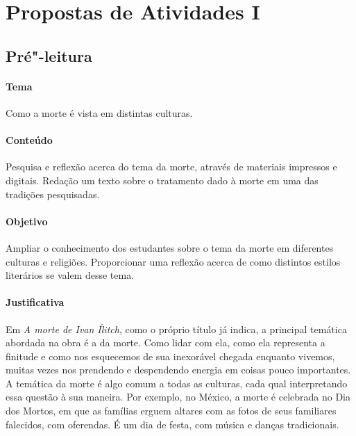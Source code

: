\documentclass[12pt]{extarticle}
\begin{document}
\section{Propostas de Atividades I}

\subsection{Pré"-leitura}

\paragraph{Tema} Como a morte é vista em distintas culturas.

\paragraph{Conteúdo} Pesquisa e reflexão acerca do tema da morte, 
através de materiais impressos e digitais. Redação um texto
sobre o tratamento dado à morte em uma das tradições pesquisadas. 

\paragraph{Objetivo} Ampliar o conhecimento dos estudantes sobre o tema da morte
em diferentes culturas e religiões. Proporcionar uma reflexão acerca
de como distintos estilos literários se valem desse tema.

\paragraph{Justificativa} Em \emph{A morte de Ivan Ílitch}, 
como o próprio título já indica, a principal temática abordada 
na obra é a da morte. Como lidar com ela, como 
ela representa a finitude e como nos esquecemos
de sua inexorável chegada enquanto vivemos, muitas 
vezes nos prendendo e despendendo energia em coisas pouco importantes. 
A temática da morte é algo comum a todas as culturas, cada 
qual interpretando essa questão à sua maneira. 
Por exemplo, no México, a morte é celebrada 
no Dia dos Mortos, em que as famílias erguem altares com as fotos de seus 
familiares falecidos, com oferendas.
É um dia de festa, com música e danças tradicionais.


\end{document}
